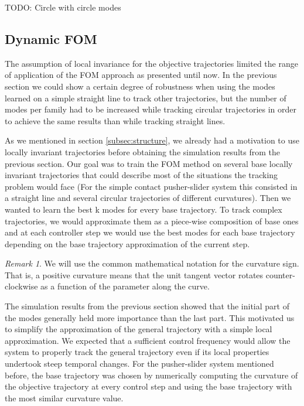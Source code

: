 \documentclass[12,twoside]{TFG-GM}
\theoremstyle{definition}
\theoremstyle{remark}
\newtheorem{remark}[theorem]{Remark}
\begin{document}
TODO: Circle with circle modes

\subsection{Dynamic FOM}
\label{subsec:dynfom}
The assumption of local invariance for the objective trajectories limited the range of application of the FOM approach as presented until now. In the previous section we could show a certain degree of robustness when using the modes learned on a simple straight line to track other trajectories, but the number of modes per family had to be increased while tracking circular trajectories in order to achieve the same results than while tracking straight lines.

As we mentioned in section \ref{subsec:structure}, we already had a motivation to use locally invariant trajectories before obtaining the simulation results from the previous section. Our goal was to train the FOM method on several base locally invariant trajectories that could describe most of the situations the tracking problem would face (For the simple contact pusher-slider system this consisted in a straight line and several circular trajectories of different curvatures). Then we wanted to learn the best k modes for every base trajectory. To track complex trajectories, we would approximate them as a piece-wise composition of base ones and at each controller step we would use the best modes for each base trajectory depending on the base trajectory approximation of the current step.

\begin{remark}
We will use the common mathematical notation for the curvature sign. That is, a positive curvature means that the unit tangent vector rotates counter-clockwise as a function of the parameter along the curve.
\end{remark}

The simulation results from  the previous section showed that the initial part of the modes generally held more importance than the last part. This motivated us to simplify the approximation of the general trajectory with a simple local approximation. We expected that a sufficient control frequency would allow the system to properly track the general trajectory even if its local properties undertook steep temporal changes. For the pusher-slider system mentioned before, the base trajectory was chosen by numerically computing the curvature of the objective trajectory at every control step and using the base trajectory with the most similar curvature value.
\end{document}
